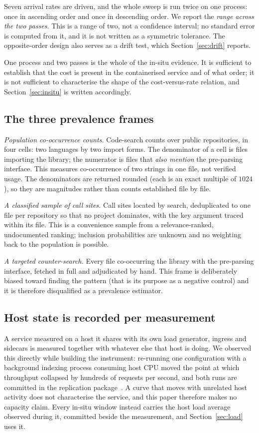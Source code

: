 \documentclass[preprint,12pt,authoryear]{elsarticle}
\begin{document}
Seven arrival rates are driven, and the whole sweep is run twice on one process:
once in ascending order and once in descending order. We report the \emph{range
across the two passes}. This is a range of two, not a confidence interval; no
standard error is computed from it, and it is not written as a symmetric
tolerance. The opposite-order design also serves as a drift test, which
Section~\ref{sec:drift} reports.

One process and two passes is the whole of the in-situ evidence. It is sufficient
to establish that the cost is present in the containerised service and of what order; it is not
sufficient to characterise the shape of the cost-versus-rate relation, and
Section~\ref{sec:insitu} is written accordingly.

\subsection{The three prevalence frames}

\emph{Population co-occurrence counts.} Code-search counts over public
repositories, in four cells: two languages by two import forms. The denominator
of a cell is files importing the library; the numerator is files that \emph{also
mention} the pre-parsing interface. This measures co-occurrence of two strings in
one file, not verified usage. The denominators are returned rounded (each is
an exact multiple of $1024$), so they are magnitudes rather than counts
established file by file.

\emph{A classified sample of call sites.} Call sites located by search,
deduplicated to one file per repository so that no project dominates, with the
key argument traced within its file. This is a convenience sample from a
relevance-ranked, undocumented ranking; inclusion probabilities are unknown and
no weighting back to the population is possible.

\emph{A targeted counter-search.} Every file co-occurring the library with the
pre-parsing interface, fetched in full and adjudicated by hand. This frame is
deliberately biased toward finding the pattern (that is its purpose as a
negative control) and it is therefore disqualified as a prevalence estimator.

\subsection{Host state is recorded per measurement}\label{sec:hoststate}

A service measured on a host it shares with its own load generator, ingress and
sidecars is measured together with whatever else that host is doing. We observed
this directly while building the instrument: re-running one configuration with a
background indexing process consuming host CPU moved the point at which
throughput collapsed by hundreds of requests per second, and both runs are
committed in the replication package~\citep{artifact2026}. A curve that moves
with unrelated host activity does not characterise the service, and this paper
therefore makes no capacity claim. Every in-situ window instead carries the host
load average observed during it, committed beside the measurement, and
Section~\ref{sec:load} uses it.
\end{document}

